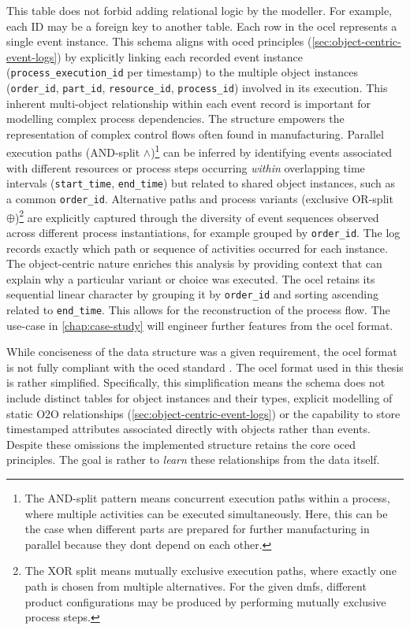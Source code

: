 This table does not forbid adding relational logic by the modeller. For example, each ID may be a foreign key to another table. Each row in the \gls{ocel} represents a single event instance. This schema aligns with \gls{oced} principles (\autoref{sec:object-centric-event-logs}) by explicitly linking each recorded event instance (\texttt{process\_execution\_id} per timestamp) to the multiple object instances (\texttt{order\_id}, \texttt{part\_id}, \texttt{resource\_id}, \texttt{process\_id}) involved in its execution. This inherent multi-object relationship within each event record is important for modelling complex process dependencies. The structure empowers the representation of complex control flows often found in manufacturing. Parallel execution paths (AND-split $\wedge$)\footnote{The AND-split pattern means concurrent execution paths within a process, where multiple activities can be executed simultaneously. Here, this can be the case when different parts are prepared for further manufacturing in parallel because they dont depend on each other.} can be inferred by identifying events associated with different resources or process steps occurring \textit{within} overlapping time intervals (\texttt{start\_time}, \texttt{end\_time}) but related to shared object instances, such as a common \texttt{order\_id}. Alternative paths and process variants (exclusive OR-split $\oplus$)\footnote{The XOR split means mutually exclusive execution paths, where exactly one path is chosen from multiple alternatives. For the given \gls{dmfs}, different product configurations may be produced by performing mutually exclusive process steps.} are explicitly captured through the diversity of event sequences observed across different process instantiations, for example grouped by \texttt{order\_id}. The log records exactly which path or sequence of activities occurred for each instance. The object-centric nature enriches this analysis by providing context that can explain why a particular variant or choice was executed. The \gls{ocel} retains its sequential linear character by grouping it by \texttt{order\_id} and sorting ascending related to \texttt{end\_time}. This allows for the reconstruction of the process flow. The use-case in \autoref{chap:case-study} will engineer further features from the \gls{ocel} format.

While conciseness of the data structure was a given requirement, the \gls{ocel} format is not fully compliant with the \gls{oced} standard \autocite{van2023object}. The \gls{ocel} format used in this thesis is rather simplified. Specifically, this simplification means the schema does not include distinct tables for object instances and their types, explicit modelling of static O2O relationships (\autoref{sec:object-centric-event-logs}) or the capability to store timestamped attributes associated directly with objects rather than events. Despite these omissions the implemented structure retains the core \gls{oced} principles. The goal is rather to \textit{learn} these relationships from the data itself.

